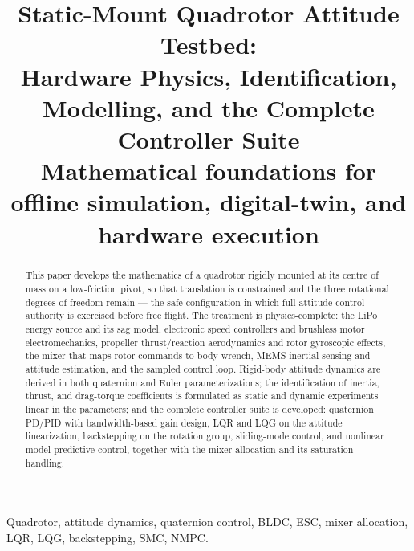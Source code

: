 \documentclass[conference]{IEEEtran}
\begin{document}
\title{Static-Mount Quadrotor Attitude Testbed:\\ Hardware Physics, Identification, Modelling, and the Complete Controller Suite\\
{\footnotesize Mathematical foundations for offline simulation, digital-twin, and hardware execution}}

\author{
}

\maketitle

\begin{abstract}
This paper develops the mathematics of a quadrotor rigidly mounted at its centre of mass on a low-friction pivot, so that translation is constrained and the three rotational degrees of freedom remain --- the safe configuration in which full attitude control authority is exercised before free flight. The treatment is physics-complete: the LiPo energy source and its sag model, electronic speed controllers and brushless motor electromechanics, propeller thrust/reaction aerodynamics and rotor gyroscopic effects, the mixer that maps rotor commands to body wrench, MEMS inertial sensing and attitude estimation, and the sampled control loop. Rigid-body attitude dynamics are derived in both quaternion and Euler parameterizations; the identification of inertia, thrust, and drag-torque coefficients is formulated as static and dynamic experiments linear in the parameters; and the complete controller suite is developed: quaternion PD/PID with bandwidth-based gain design, LQR and LQG on the attitude linearization, backstepping on the rotation group, sliding-mode control, and nonlinear model predictive control, together with the mixer allocation and its saturation handling.
\end{abstract}

\begin{IEEEkeywords}
Quadrotor, attitude dynamics, quaternion control, BLDC, ESC, mixer allocation, LQR, LQG, backstepping, SMC, NMPC.
\end{IEEEkeywords}

\end{document}
